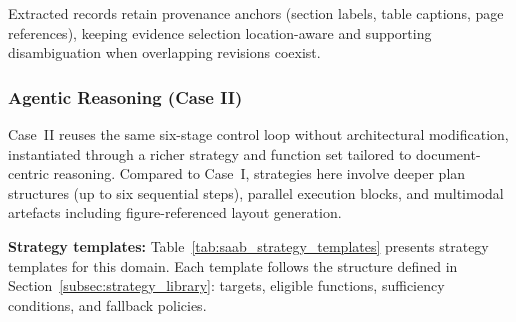 \documentclass[largeformat]{interact}
\begin{document}
Extracted records retain provenance anchors (section labels, table captions, page references), keeping evidence selection location-aware and supporting disambiguation when overlapping revisions coexist.

\subsubsection{Agentic Reasoning (Case II)}
\label{subsubsec:saab_agentic_reasoning}
Case~II reuses the same six-stage control loop without architectural modification, instantiated through a richer strategy and function set tailored to document-centric reasoning. Compared to Case~I, strategies here involve deeper plan structures (up to six sequential steps), parallel execution blocks, and multimodal artefacts including figure-referenced layout generation.

\noindent \textbf{Strategy templates:}
Table~\ref{tab:saab_strategy_templates} presents strategy templates for this domain. Each template follows the structure defined in Section~\ref{subsec:strategy_library}: targets, eligible functions, sufficiency conditions, and fallback policies.
\end{document}
